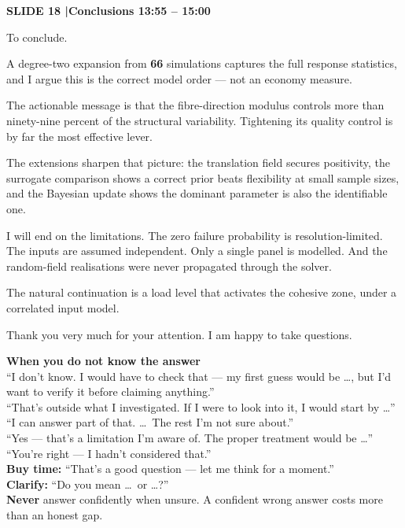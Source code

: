 \documentclass[12pt,a4paper]{article}
\newcommand{\slide}[3]{%
  \bigskip
  \noindent\colorbox{luhblue}{\parbox{\dimexpr\linewidth-2\fboxsep}{%
    \color{white}\bfseries\small SLIDE #1 \quad|\quad #2 \hfill #3}}\par
  \nopagebreak\vspace{0.3em}}
\newcommand{\num}[1]{\textbf{#1}}
\begin{document}
\slide{18}{Conclusions}{13:55 -- 15:00}

To conclude.

A degree-two expansion from \num{66} simulations captures the full response statistics,
and I argue this is the correct model order --- not an economy measure.

The actionable message is that the fibre-direction modulus controls more than ninety-nine
percent of the structural variability. Tightening its quality control is by far the most
effective lever.

The extensions sharpen that picture: the translation field secures positivity, the
surrogate comparison shows a correct prior beats flexibility at small sample sizes, and
the Bayesian update shows the dominant parameter is also the identifiable one.

I will end on the limitations. The zero failure probability is resolution-limited. The
inputs are assumed independent. Only a single panel is modelled. And the random-field
realisations were never propagated through the solver.

The natural continuation is a load level that activates the cohesive zone, under a
correlated input model.

Thank you very much for your attention. I am happy to take questions.

\vspace{1em}
\begin{tcolorbox}[colback=soft,colframe=luhblue,boxrule=0.6pt,arc=2pt]
{\bfseries When you do not know the answer}\\[0.4em]
``I don't know. I would have to check that --- my first guess would be \ldots, but I'd want
to verify it before claiming anything.''\\[0.3em]
``That's outside what I investigated. If I were to look into it, I would start by \ldots''\\[0.3em]
``I can answer part of that. \ldots\ The rest I'm not sure about.''\\[0.3em]
``Yes --- that's a limitation I'm aware of. The proper treatment would be \ldots''\\[0.3em]
``You're right --- I hadn't considered that.''\\[0.5em]
{\bfseries Buy time:} ``That's a good question --- let me think for a moment.''\\
{\bfseries Clarify:} ``Do you mean \ldots\ or \ldots?''\\[0.5em]
{\bfseries Never} answer confidently when unsure. A confident wrong answer costs more than
an honest gap.
\end{tcolorbox}
\end{document}
